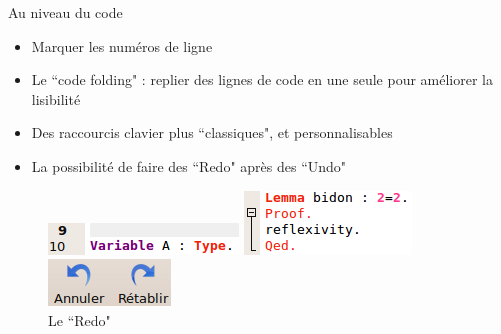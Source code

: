         \begin{frame}{Au niveau du code}        
            \begin{itemize}
                \item Marquer les numéros de ligne
                \item Le ``code folding" : replier des lignes de code en une seule pour améliorer la lisibilité
                \item Des raccourcis clavier plus ``classiques", et personnalisables
                \item La possibilité de faire des ``Redo" après des ``Undo"
            \end{itemize}
            \begin{figure}[ht]
                \begin{minipage}[b]{0.3\linewidth}
                    \centering
                    \includegraphics[scale=0.5]{../images/ide/lines.png}
                    \caption{La numérotation des lignes}
                \end{minipage}
                \hfill
                \begin{minipage}[b]{0.3\linewidth}   
	                \centering
	                \includegraphics[scale=0.5]{../images/ide/folding.png}
	                \caption{Le ``code folding"}
                \end{minipage}
                \hfill
                \begin{minipage}[b]{0.3\linewidth}   
	                \centering
	                \includegraphics[scale=0.5]{../images/ide/redo.png}
	                \caption{Le ``Redo"}
	            \end{minipage}
            \end{figure}
        \end{frame}
            
